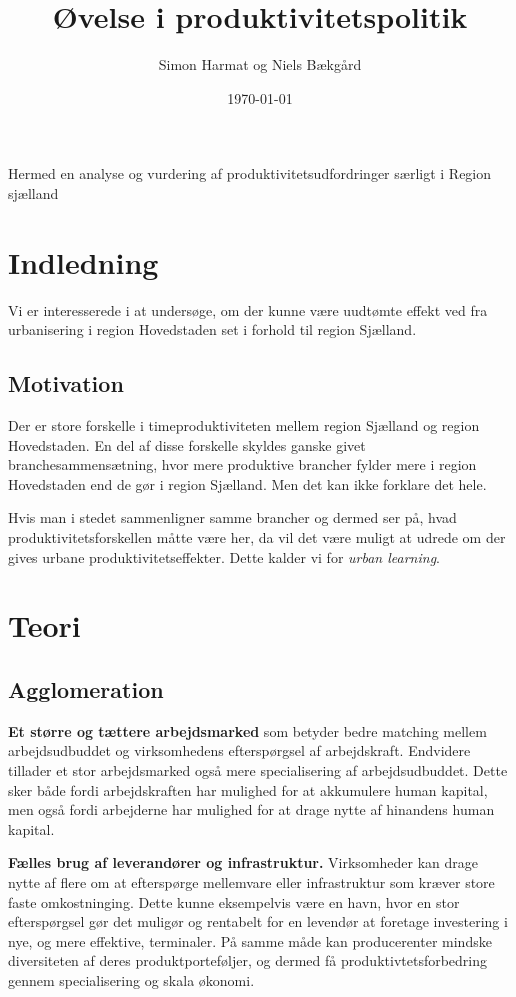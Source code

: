 \documentclass[a4paper, 12pt, titlepage]{article}
\author{Simon Harmat og Niels Bækgård}
\title{Øvelse i produktivitetspolitik}
\date{\today}
\begin{document}
Hermed en analyse og vurdering af produktivitetsudfordringer særligt i Region sjælland

\section{Indledning}
Vi er interesserede i at undersøge, om der kunne være uudtømte effekt ved fra urbanisering i region Hovedstaden set i forhold til region Sjælland. 
\subsection{Motivation}
Der er store forskelle i timeproduktiviteten mellem region Sjælland og region Hovedstaden. En del af disse forskelle skyldes ganske givet branchesammensætning, hvor mere produktive brancher fylder mere i region Hovedstaden end de gør i region Sjælland. Men det kan ikke forklare det hele.

Hvis man i stedet sammenligner samme brancher og dermed ser på, hvad produktivitetsforskellen måtte være her, da vil det være muligt at udrede om der gives urbane produktivitetseffekter. Dette kalder vi for \emph{urban learning}.
\section{Teori}
\subsection{Agglomeration}

\textbf{Et større og tættere arbejdsmarked} som betyder bedre matching mellem arbejdsudbuddet og virksomhedens efterspørgsel af arbejdskraft. Endvidere tillader et stor arbejdsmarked også mere specialisering af arbejdsudbuddet. Dette sker både fordi arbejdskraften har mulighed for at akkumulere human kapital, men også fordi arbejderne har mulighed for at drage nytte af hinandens human kapital.  

\textbf{Fælles brug af leverandører og infrastruktur.} Virksomheder kan drage nytte af flere om at efterspørge mellemvare eller infrastruktur som kræver store faste omkostninging. Dette kunne eksempelvis være en havn, hvor en stor efterspørgsel gør det muligør og rentabelt for en levendør  at foretage investering i nye, og mere effektive, terminaler. På samme måde kan producerenter mindske diversiteten af deres produktporteføljer, og dermed få produktivtetsforbedring gennem specialisering og skala økonomi.    
\end{document}
